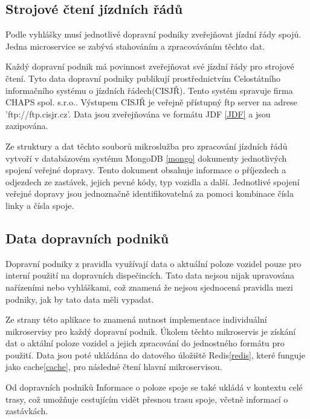 \subsection [Jízdní řády]{Strojové čtení jízdních řádů} \label{strojoveCteniJR}
Podle vyhlášky\cite{vyhlaskaJizdniRady} musí jednotlivé dopravní podniky zveřejňovat jízdní řády spojů. Jedna microservice se zabývá stahováním a zpracováváním těchto dat. \par
Každý dopravní podnik má povinnost zveřejňovat své jízdní řády pro strojové čtení. Tyto data dopravní podniky publikují prostřednictvím Celostátního informačního systému o jízdních řádech(CISJŘ)\cite{cisjr}. Tento systém spravuje firma CHAPS spol. s.r.o.\cite{chaps}. Výstupem CISJŘ je veřejně přístupný ftp server na adrese 'ftp://ftp.cisjr.cz'. Data jsou zveřejňována ve formátu JDF \ref{JDF} a jsou zazipována. \par
Ze struktury a dat těchto souborů mikroslužba pro zpracování jízdních řádů vytvoří v databázovém systému MongoDB \ref{mongo} dokumenty jednotlivých spojení veřejné dopravy. Tento dokument obsahuje informace o příjezdech a odjezdech ze zastávek, jejich pevné kódy, typ vozidla a další. Jednotlivé spojení veřejné dopravy jsou jednoznačně identifikovatelná za pomoci kombinace čísla linky a čísla spoje.
\subsection {Data dopravních podniků}
Dopravní podniky z pravidla využívají data o aktuální poloze vozidel pouze pro interní použití na dopravních dispečincích. Tato data nejsou nijak upravována nařízeními nebo vyhláškami, což znamená že nejsou sjednocená pravidla mezi podniky, jak by tato data měli vypadat.\par
Ze strany této aplikace to znamená nutnost implementace individuální mikroservisy pro každý dopravní podnik. Úkolem těchto mikroservis je získání dat o aktální poloze vozidel a jejich zpracování do jednostného formátu pro použití. Data jsou poté ukládána do datového úložiště Redis\ref{redis}, které funguje jako cache\ref{cache},  pro následné čtení hlavní mikroservisou.\par
Od dopravních podniků
Informace o poloze spoje se také ukládá v kontextu celé trasy, což umožňuje cestujícím vidět přesnou trasu spoje, včetně informací o zastávkách.
